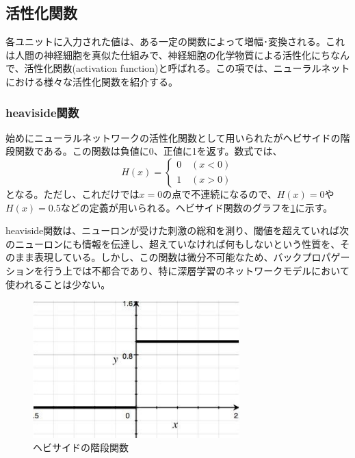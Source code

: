 \subsection{活性化関数}
各ユニットに入力された値は、ある一定の関数によって増幅･変換される。これは人間の神経細胞を真似た仕組みで、神経細胞の化学物質による活性化にちなんで、活性化関数(activation function)と呼ばれる。この項では、ニューラルネットにおける様々な活性化関数を紹介する。
\subsubsection{heaviside関数}
始めにニューラルネットワークの活性化関数として用いられたがヘビサイドの階段関数である。この関数は負値に0、正値に1を返す。数式では、
\begin{equation}
H(x)= \left\{\begin{array}{cc} 0\quad (x < 0)\\ 1 \quad (x > 0)\end{array}\right.
\end{equation}
となる。ただし、これだけでは$x=0$の点で不連続になるので、$H(x)=0$や$H(x)=0.5$などの定義が用いられる。ヘビサイド関数のグラフを\ref{c3_heaviside}に示す。\par
heaviside関数は、ニューロンが受けた刺激の総和を測り、閾値を超えていれば次のニューロンにも情報を伝達し、超えていなければ何もしないという性質を、そのまま表現している。しかし、この関数は微分不可能なため、バックプロパゲーションを行う上では不都合であり、特に深層学習のネットワークモデルにおいて使われることは少ない。
\begin{figure}[tbp]
 \centering
  \includegraphics[width=80mm]{img/c3/heaviside}
 \caption{ヘビサイドの階段関数}
 \label{c3_heaviside}
\end{figure}

